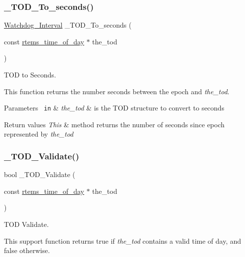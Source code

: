 \subsubsection{\texorpdfstring{\_TOD\_To\_seconds()}{\_TOD\_To\_seconds()}}
{\footnotesize\ttfamily \mbox{\hyperlink{group__RTEMSScoreWatchdog_gaa1834fd7531ca9bb5c4ca6fd990388d5}{Watchdog\+\_\+\+Interval}} \+\_\+\+T\+O\+D\+\_\+\+To\+\_\+seconds (\begin{DoxyParamCaption}\item[{const \mbox{\hyperlink{structrtems__time__of__day}{rtems\+\_\+time\+\_\+of\+\_\+day}} $\ast$}]{the\+\_\+tod }\end{DoxyParamCaption})}



T\+OD to Seconds. 

This function returns the number seconds between the epoch and {\itshape the\+\_\+tod}.


\begin{DoxyParams}[1]{Parameters}
\mbox{\texttt{ in}}  & {\em the\+\_\+tod} & is the T\+OD structure to convert to seconds\\
\hline
\end{DoxyParams}

\begin{DoxyRetVals}{Return values}
{\em This} & method returns the number of seconds since epoch represented by {\itshape the\+\_\+tod} \\
\hline
\end{DoxyRetVals}
\mbox{\label{group__ClassicClock_ga80a0ad7cf75ab4da2f69eea860daeb77}} 
\subsubsection{\texorpdfstring{\_TOD\_Validate()}{\_TOD\_Validate()}}
{\footnotesize\ttfamily bool \+\_\+\+T\+O\+D\+\_\+\+Validate (\begin{DoxyParamCaption}\item[{const \mbox{\hyperlink{structrtems__time__of__day}{rtems\+\_\+time\+\_\+of\+\_\+day}} $\ast$}]{the\+\_\+tod }\end{DoxyParamCaption})}



T\+OD Validate. 

This support function returns true if {\itshape the\+\_\+tod} contains a valid time of day, and false otherwise.


